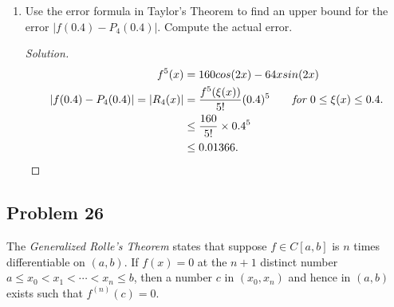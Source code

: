 \documentclass{article}
\begin{document}
\begin{enumerate}[label=(\alph*)]
    \item Use the error formula in Taylor's Theorem to find an upper bound for the error
    $|f(0.4) - P_4(0.4)|$. Compute the actual error.

    \begin{proof}[Solution]
        \begin{align*}
            f^5(x) & = 160cos(2x) - 64xsin(2x) \\
            |f(0.4) - P_4(0.4)| = |R_4(x)| & = \frac{f^5(\xi(x))}{5!}(0.4)^5 \qquad 
            \emph{for } 0 \le \xi(x) \le 0.4. \\
            & \le \frac{160}{5!}\times 0.4^5 \\
            & \le 0.01366.
        \end{align*}
    \end{proof}
\end{enumerate}

\subsection*{Problem 26} 
The \emph{Generalized Rolle's Theorem} states that suppose $f\in C[a,b]$ is $n$ times differentiable 
on $(a,b)$. If $f(x) = 0$ at the $n+1$ distinct number $a\le x_0<x_1<\cdots <x_n\le b$, then a 
number $c$ in $(x_0, x_n)$ and hence in $(a,b)$ exists such that $f^{(n)}(c) = 0$.
\end{document}
